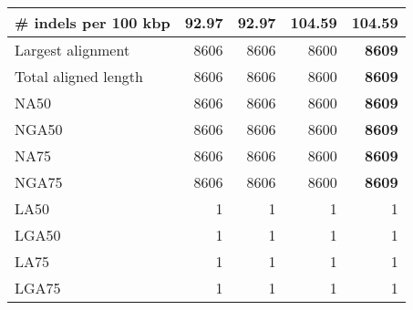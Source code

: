 \documentclass[12pt,a4paper]{article}
\begin{document}
\begin{table}[ht]
\begin{center}
\begin{tabular}{|l*{4}{|r}|}
\# indels per 100 kbp & {\bf 92.97} & {\bf 92.97} & 104.59 & 104.59 \\ \hline
Largest alignment & 8606 & 8606 & 8600 & {\bf 8609} \\ \hline
Total aligned length & 8606 & 8606 & 8600 & {\bf 8609} \\ \hline
NA50 & 8606 & 8606 & 8600 & {\bf 8609} \\ \hline
NGA50 & 8606 & 8606 & 8600 & {\bf 8609} \\ \hline
NA75 & 8606 & 8606 & 8600 & {\bf 8609} \\ \hline
NGA75 & 8606 & 8606 & 8600 & {\bf 8609} \\ \hline
LA50 & 1 & 1 & 1 & 1 \\ \hline
LGA50 & 1 & 1 & 1 & 1 \\ \hline
LA75 & 1 & 1 & 1 & 1 \\ \hline
LGA75 & 1 & 1 & 1 & 1 \\ \hline
\end{tabular}
\end{center}
\end{table}
\end{document}
